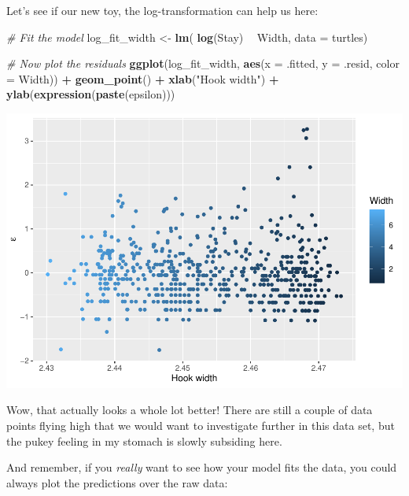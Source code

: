 \documentclass[
]{book}
\newenvironment{Shaded}{\begin{snugshade}}{\end{snugshade}}
\newcommand{\CommentTok}[1]{\textcolor[rgb]{0.56,0.35,0.01}{\textit{#1}}}
\newcommand{\DataTypeTok}[1]{\textcolor[rgb]{0.13,0.29,0.53}{#1}}
\newcommand{\KeywordTok}[1]{\textcolor[rgb]{0.13,0.29,0.53}{\textbf{#1}}}
\newcommand{\NormalTok}[1]{#1}
\newcommand{\OperatorTok}[1]{\textcolor[rgb]{0.81,0.36,0.00}{\textbf{#1}}}
\newcommand{\StringTok}[1]{\textcolor[rgb]{0.31,0.60,0.02}{#1}}
\begin{document}
Let's see if our new toy, the log-transformation can help us here:

\begin{Shaded}
\begin{Highlighting}[]
\CommentTok{# Fit the model}
\NormalTok{log_fit_width <-}\StringTok{ }\KeywordTok{lm}\NormalTok{( }\KeywordTok{log}\NormalTok{(Stay) }\OperatorTok{~}\StringTok{ }\NormalTok{Width, }\DataTypeTok{data =}\NormalTok{ turtles)}

\CommentTok{# Now plot the residuals}
\KeywordTok{ggplot}\NormalTok{(log_fit_width, }\KeywordTok{aes}\NormalTok{(}\DataTypeTok{x =}\NormalTok{ .fitted, }\DataTypeTok{y =}\NormalTok{ .resid, }\DataTypeTok{color =}\NormalTok{ Width)) }\OperatorTok{+}\StringTok{ }
\StringTok{  }\KeywordTok{geom_point}\NormalTok{() }\OperatorTok{+}
\StringTok{  }\KeywordTok{xlab}\NormalTok{(}\StringTok{"Hook width"}\NormalTok{) }\OperatorTok{+}\StringTok{ }
\StringTok{  }\KeywordTok{ylab}\NormalTok{(}\KeywordTok{expression}\NormalTok{(}\KeywordTok{paste}\NormalTok{(epsilon)))}
\end{Highlighting}
\end{Shaded}

\includegraphics{worstr_files/figure-latex/unnamed-chunk-240-1.pdf}

Wow, that actually looks a whole lot better! There are still a couple of data points flying high that we would want to investigate further in this data set, but the pukey feeling in my stomach is slowly subsiding here.

And remember, if you \emph{really} want to see how your model fits the data, you could always plot the predictions over the raw data:
\end{document}
